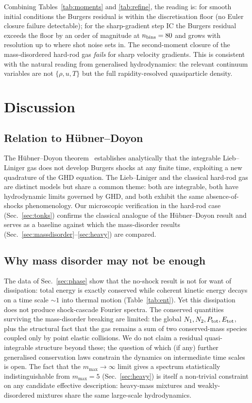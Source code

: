 \documentclass[aps,pre,twocolumn,superscriptaddress,longbibliography,floatfix]{revtex4-2}
\begin{document}
Combining Tables~\ref{tab:moments} and \ref{tab:refine}, the
reading is: for smooth initial conditions the Burgers
residual is within the discretisation floor (no Euler closure
failure detectable); for the sharp-gradient step IC the
Burgers residual exceeds the floor by an order of magnitude at
$n_{\rm bins}=80$ and grows with resolution up to where shot
noise sets in. The second-moment closure of the
mass-disordered hard-rod gas \emph{fails} for sharp velocity
gradients. This is consistent with the natural reading from
generalised hydrodynamics: the relevant continuum variables
are not $\{\rho, u, T\}$ but the full rapidity-resolved
quasiparticle density.

\section{Discussion}\label{sec:discussion}

\subsection{Relation to H\"ubner--Doyon}

The H\"ubner--Doyon theorem~\cite{HubnerDoyon2024} establishes
analytically that the integrable Lieb--Liniger gas does not
develop Burgers shocks at any finite time, exploiting a new
quadrature of the GHD equation. The Lieb--Liniger and the
classical hard-rod gas are distinct models but share a common
theme: both are integrable, both have hydrodynamic limits
governed by GHD, and both exhibit the same absence-of-shocks
phenomenology. Our microscopic verification in the
hard-rod case (Sec.~\ref{sec:tonks}) confirms the classical
analogue of the H\"ubner--Doyon result and serves as a baseline
against which the mass-disorder results
(Sec.~\ref{sec:massdisorder}--\ref{sec:heavy}) are
compared.

\subsection{Why mass disorder may not be enough}

The data of Sec.~\ref{sec:phase} show that the no-shock result
is not for want of dissipation: total energy is exactly
conserved while coherent kinetic energy decays on a time scale
$\sim 1$ into thermal motion (Table~\ref{tab:ent}). Yet this
dissipation does not produce shock-cascade Fourier
spectra. The conserved quantities surviving the mass-disorder
breaking are limited: the global $N_1,N_2,P_{\rm tot},
E_{\rm tot}$, plus the structural fact that the gas remains a
sum of two conserved-mass species coupled only by point
elastic collisions. We do not claim a residual quasi-integrable
structure beyond these; the question of which (if any) further
generalised conservation laws constrain the dynamics on
intermediate time scales is open. The fact that the
$m_{\max}\to\infty$ limit gives a spectrum
statistically indistinguishable from $m_{\max}=5$
(Sec.~\ref{sec:heavy}) is itself a non-trivial constraint on
any candidate effective description: heavy-mass mixtures and
weakly-disordered mixtures share the same large-scale
hydrodynamics.
\end{document}
